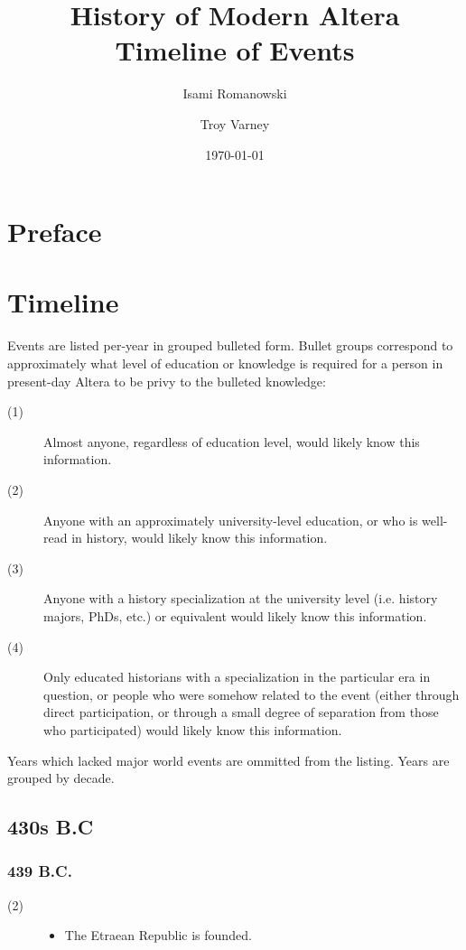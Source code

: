 \documentclass[a4paper, 11pt]{article}
\def\level#1{\item[(#1)\hspace{9.5pt}]}
\newenvironment{knowlevels}{\begin{description}}{\end{description}} %
\begin{document}
\title{History of Modern Altera \\ \large{Timeline of Events}}
\date{\today}
\author{Isami Romanowski \and Troy Varney}
\maketitle

\tableofcontents

\section{Preface}

\section{Timeline}
Events are listed per-year in grouped bulleted form.  Bullet groups correspond to approximately what level of education or knowledge is required for a person in present-day Altera to be privy to the bulleted knowledge:
\begin{knowlevels}
\level{1}  Almost anyone, regardless of education level, would likely know this information.

\level{2}  Anyone with an approximately university-level education, or who is well-read in history, would likely know this information.

\level{3}  Anyone with a history specialization at the university level (i.e. history majors, PhDs, etc.) or equivalent would likely know this information.

\level{4}  Only educated historians with a specialization in the particular era in question, or people who were somehow related to the event (either through direct participation, or through a small degree of separation from those who participated) would likely know this information.
\end{knowlevels}
Years which lacked major world events are ommitted from the listing.  Years are grouped by decade.

\subsection{430s B.C}
\subsubsection{439 B.C.}
\begin{knowlevels}
\level{2} {
  \begin{itemize}
  \item The Etraean Republic is founded.
  \end{itemize}
}
\end{knowlevels}
\end{document}
